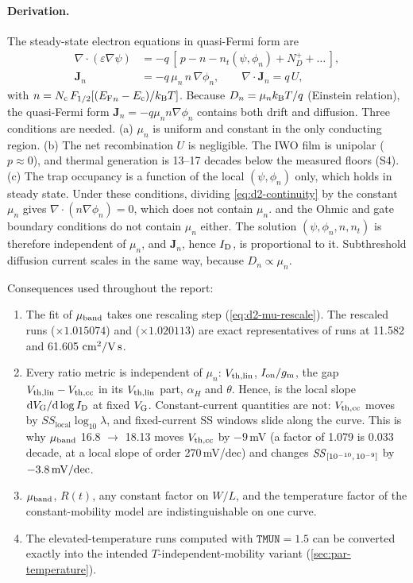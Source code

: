 \paragraph{Derivation.}
\begin{derivation}
The steady-state electron equations in quasi-Fermi form are
\begin{align}
  \nabla\cdot(\varepsilon\nabla\psi) &= -q\,[\,p - n - n_t(\psi,\phi_n) + N_D^{+} + \dots\,], \label{eq:d2-poisson}\\
  \mathbf{J}_n &= -q\,\mu_n\,n\,\nabla\phi_n, \qquad \nabla\cdot\mathbf{J}_n = q\,U, \label{eq:d2-continuity}
\end{align}
with $n = N_{\mathrm{c}}\,F_{1/2}\!\left[({E_{\mathrm{F}}}_{n}-E_{\mathrm{c}})/k_{\mathrm{B}}T\right]$. Because $D_n=\mu_nk_{\mathrm{B}}T/q$ (Einstein relation), the quasi-Fermi form $\mathbf{J}_n=-q\mu_n n\nabla\phi_n$ contains both drift and diffusion. Three conditions are needed. (a) $\mu_n$ is uniform and constant in the only conducting region. (b) The net recombination $U$ is negligible. The IWO film is unipolar ($p\approx0$), and thermal generation is 13--17 decades below the measured floors (S4). (c) The trap occupancy is a function of the local $(\psi,\phi_n)$ only, which holds in steady state. Under these conditions, dividing \cref{eq:d2-continuity} by the constant $\mu_n$ gives $\nabla\cdot(n\nabla\phi_n)=0$, which does not contain $\mu_n$.  and the Ohmic and gate boundary conditions do not contain $\mu_n$ either. The solution $(\psi,\phi_n,n,n_t)$ is therefore independent of $\mu_n$, and $\mathbf{J}_n$, hence $I_{\mathrm{D}}$, is proportional to it. Subthreshold diffusion current scales in the same way, because $D_n\propto\mu_n$.
\end{derivation}

Consequences used throughout the report:
\begin{enumerate}
\item The fit of $\mu_{\mathrm{band}}$ takes one rescaling step (\cref{eq:d2-mu-rescale}). The rescaled runs  ($\times1.015074$) and  ($\times1.020113$) are exact representatives of runs at 11.582 and 61.605\,$\,\mathrm{cm}^{2}/\mathrm{V\,s}$.
\item Every ratio metric is independent of $\mu_n$: $V_{\mathrm{th,lin}}$, $I_{\mathrm{on}}/g_{\mathrm{m}}$, the gap $V_{\mathrm{th,lin}}-V_{\mathrm{th,cc}}$ in its $V_{\mathrm{th,lin}}$ part, $\alpha_H$ and $\theta$. Hence, is the local slope $\mathrm{d}V_{\mathrm{G}}/\mathrm{d}\log I_{\mathrm{D}}$ at fixed $V_{\mathrm{G}}$. Constant-current quantities are not: $V_{\mathrm{th,cc}}$ moves by $\mathit{SS}_{\mathrm{local}}\log_{10}\lambda$, and fixed-current SS windows slide along the curve. This is why $\mu_{\mathrm{band}}$ 16.8 $\rightarrow$ 18.13 moves $V_{\mathrm{th,cc}}$ by $-9$\,mV (a factor of 1.079 is 0.033 decade, at a local slope of order 270\,mV/dec) and changes $\mathit{SS}_{[10^{-10},\,10^{-9}]}$ by $-3.8\,\mathrm{mV/dec}$.
\item $\mu_{\mathrm{band}}$, $R(t)$, any constant factor on $W/L$, and the temperature factor of the constant-mobility model are indistinguishable on one curve.
\item The elevated-temperature runs computed with $\texttt{TMUN}=1.5$ can be converted exactly into the intended $T$-independent-mobility variant (\cref{sec:par-temperature}).
\end{enumerate}

